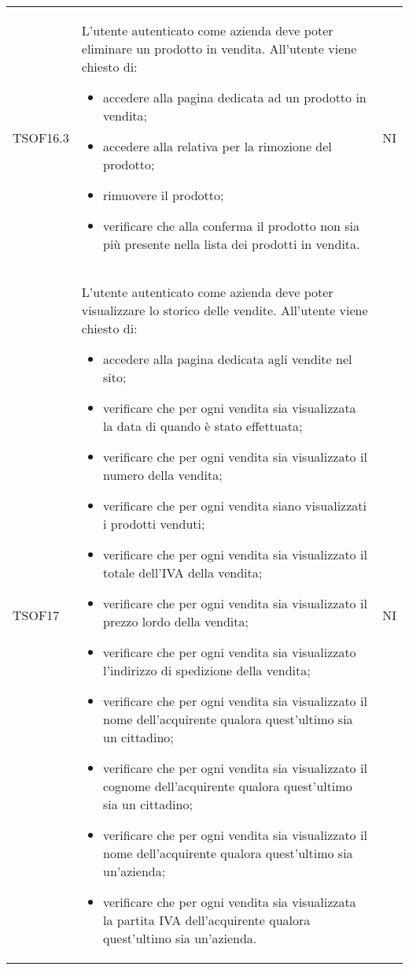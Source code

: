 \begin{longtable}{ >{\centering}p{} >{\centering}p{}
			>{\centering}p{}}
		\tabularnewline
		TSOF16.3	&	L'utente autenticato come azienda deve poter eliminare
		un prodotto in vendita. All'utente viene chiesto di:
		\begin{itemize}
			\item accedere alla pagina dedicata ad un prodotto in vendita;
			\item accedere alla relativa per la rimozione del prodotto;
			\item rimuovere il prodotto;
			\item verificare che alla conferma il prodotto non sia più presente nella
			lista dei prodotti in vendita.
		\end{itemize}	&	NI
		\tabularnewline
		
		TSOF17	&	L'utente autenticato come azienda deve poter visualizzare lo storico delle
		vendite. All'utente viene chiesto di:
		\begin{itemize}
			\item accedere alla pagina dedicata agli vendite nel sito;
			\item verificare che per ogni vendita sia visualizzata la data di quando
			è stato effettuata;
			\item verificare che per ogni vendita sia visualizzato il numero
			della vendita;
			\item verificare che per ogni vendita siano visualizzati i prodotti
			venduti;
			\item verificare che per ogni vendita sia visualizzato il totale dell'IVA
			della vendita;
			\item verificare che per ogni vendita sia visualizzato il prezzo
			lordo\glo{} della vendita;
			\item verificare che per ogni vendita sia visualizzato l'indirizzo di 
			spedizione della vendita;
			\item verificare che per ogni vendita sia visualizzato il nome
			dell'acquirente qualora quest'ultimo sia un cittadino;
			\item verificare che per ogni vendita sia visualizzato il cognome
			dell'acquirente qualora quest'ultimo sia un cittadino;
			\item verificare che per ogni vendita sia visualizzato il nome
			dell'acquirente qualora quest'ultimo sia un'azienda;
			\item verificare che per ogni vendita sia visualizzata la partita IVA
			dell'acquirente qualora quest'ultimo sia un'azienda.
		\end{itemize}	&	NI
		\tabularnewline
		

\end{longtable}
